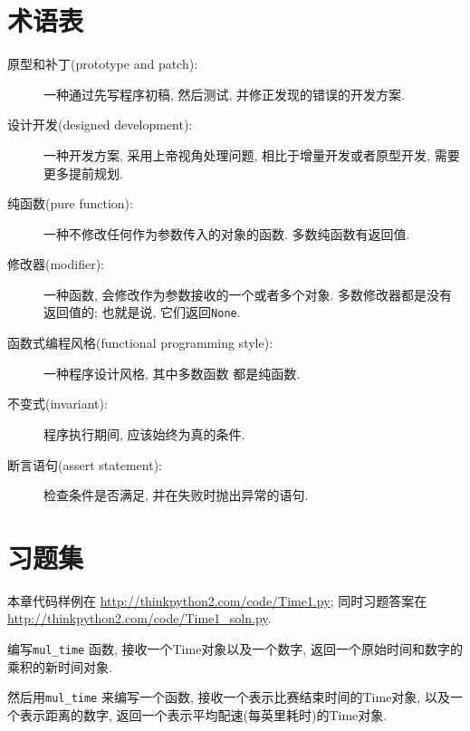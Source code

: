 \documentclass[10pt]{book}
\begin{document}
\section{术语表}

\begin{description}

\item[原型和补丁(prototype and patch):] 一种通过先写程序初稿, 然后测试, 并修正发现的错误的开发方案. 

\item[设计开发(designed development):] 一种开发方案, 采用上帝视角处理问题, 
相比于增量开发或者原型开发, 需要更多提前规划. 

\item[纯函数(pure function):] 一种不修改任何作为参数传入的对象的函数. 
多数纯函数有返回值. 

\item[修改器(modifier):] 一种函数, 
会修改作为参数接收的一个或者多个对象. 
多数修改器都是没有返回值的;
也就是说, 它们返回{\tt None}. 

\item[函数式编程风格(functional programming style):] 一种程序设计风格, 其中多数函数
都是纯函数.

\item[不变式(invariant):] 程序执行期间, 应该始终为真的条件. 

\item[断言语句(assert statement):] 检查条件是否满足, 并在失败时抛出异常的语句. 

\end{description}


\section{习题集}

本章代码样例在
\url{http://thinkpython2.com/code/Time1.py}; 
同时习题答案在\url{http://thinkpython2.com/code/Time1_soln.py}.

\begin{exercise}

编写\verb"mul_time" 函数, 接收一个Time对象以及一个数字, 
返回一个原始时间和数字的乘积的新时间对象. 

然后用\verb"mul_time" 来编写一个函数, 接收一个表示比赛结束时间的Time对象, 
以及一个表示距离的数字, 返回一个表示平均配速(每英里耗时)的Time对象. 

\end{exercise}
\end{document}
